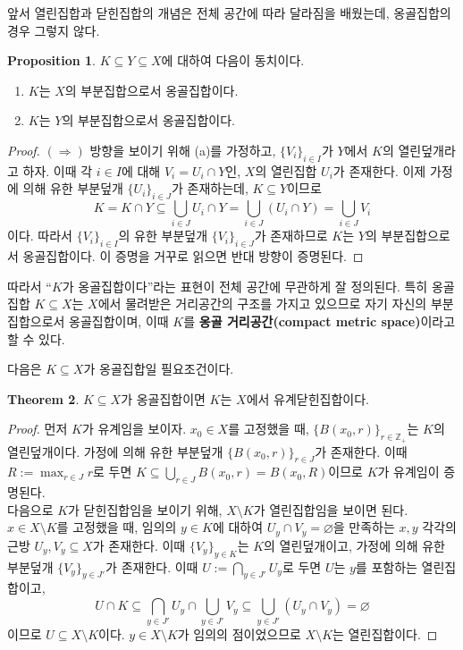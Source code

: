 \documentclass[11pt]{book}
\numberwithin{equation}{chapter}
\def\ZZ{\mathbb{Z}}
\theoremstyle{definition}
\newtheorem{thm}{Theorem}[section]
\newtheorem{prop}[thm]{Proposition}
\newenvironment{enum}
	{\begin{enumerate}[label=(\alph*), leftmargin=2\parindent]}
	{\end{enumerate}}
\begin{document}
앞서 열린집합과 닫힌집합의 개념은 전체 공간에 따라 달라짐을 배웠는데, 옹골집합의 경우 그렇지 않다.

\begin{prop}
    \(K \subseteq Y \subseteq X\)에 대하여 다음이 동치이다.
    \begin{enum}
        \item \(K\)는 \(X\)의 부분집합으로서 옹골집합이다.
        \item \(K\)는 \(Y\)의 부분집합으로서 옹골집합이다.
    \end{enum}
\end{prop}
\begin{proof}
    \((\Rightarrow)\) 방향을 보이기 위해 (a)를 가정하고, \(\{V_i\}_{i \in I}\)가 \(Y\)에서 \(K\)의 열린덮개라고 하자. 이때 각 \(i \in I\)에 대해 \(V_i = U_i \cap Y\)인, \(X\)의 열린집합 \(U_i\)가 존재한다. 이제 가정에 의해 유한 부분덮개 \(\{U_i\}_{i \in J}\)가 존재하는데, \(K \subseteq Y\)이므로
    \[
    K = K \cap Y \subseteq \bigcup_{i \in J} U_i \cap Y = \bigcup_{i \in J} (U_i \cap Y) = \bigcup_{i \in J} V_i    
    \]
    이다. 따라서 \(\{V_i\}_{i \in I}\)의 유한 부분덮개 \(\{V_i\}_{i \in J}\)가 존재하므로 \(K\)는 \(Y\)의 부분집합으로서 옹골집합이다. 이 증명을 거꾸로 읽으면 반대 방향이 증명된다.
\end{proof}

따라서 ``\(K\)가 옹골집합이다''라는 표현이 전체 공간에 무관하게 잘 정의된다. 특히 옹골집합 \(K \subseteq X\)는 \(X\)에서 물려받은 거리공간의 구조를 가지고 있으므로 자기 자신의 부분집합으로서 옹골집합이며, 이때 \(K\)를 \textbf{옹골 거리공간(compact metric space)}이라고 할 수 있다.

다음은 \(K \subseteq X\)가 옹골집합일 필요조건이다.

\begin{thm} \label{thm 6.1.3}
    \(K \subseteq X\)가 옹골집합이면 \(K\)는 \(X\)에서 유계닫힌집합이다.
\end{thm}
\begin{proof}
    먼저 \(K\)가 유계임을 보이자. \(x_0 \in X\)를 고정했을 때, \(\{B(x_0, r)\}_{r \in \ZZ_+}\)는 \(K\)의 열린덮개이다. 가정에 의해 유한 부분덮개 \(\{B(x_0, r)\}_{r \in J}\)가 존재한다. 이때 \(R := \max_{r \in J} r \)로 두면 \(K \subseteq \bigcup_{r \in J} B(x_0, r) = B(x_0, R)\)이므로 \(K\)가 유계임이 증명된다.\\
    다음으로 \(K\)가 닫힌집합임을 보이기 위해, \(X \setminus K\)가 열린집합임을 보이면 된다. \(x \in X \setminus K\)를 고정했을 때, 임의의 \(y \in K\)에 대하여 \(U_y \cap V_y = \varnothing\)을 만족하는 \(x, y\) 각각의 근방 \(U_y, V_y \subseteq X\)가 존재한다. 이때 \(\{V_y\}_{y \in K}\)는 \(K\)의 열린덮개이고, 가정에 의해 유한 부분덮개 \(\{V_y\}_{y \in J'}\)가 존재한다. 이때 \(U := \bigcap_{y \in J'} U_y\)로 두면 \(U\)는 \(y\)를 포함하는 열린집합이고,
    \[
    U \cap K \subseteq \bigcap_{y \in J'} U_y \cap \bigcup_{y \in J'} V_y \subseteq \bigcup_{y \in J'} (U_y \cap V_y) = \varnothing     
    \]
    이므로 \(U \subseteq X \setminus K\)이다. \(y \in X \setminus K\)가 임의의 점이었으므로 \(X \setminus K\)는 열린집합이다.
\end{proof}
\end{document}
